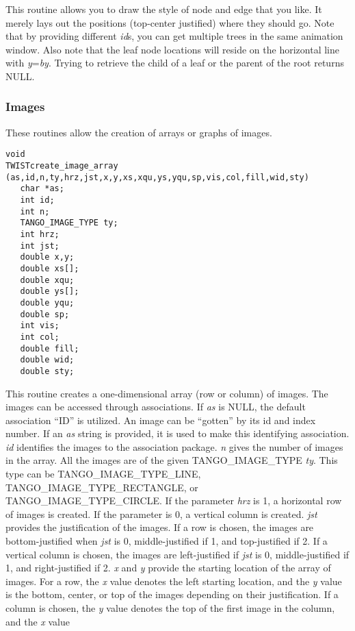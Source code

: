 This routine allows you to draw the style of node and edge that you like.  It
merely lays out the positions (top-center justified) where they should go.
Note that by providing different {\em id}s, you can get multiple trees in the
same animation window.  Also note that the leaf node locations will reside on
the horizontal line with {\em y}={\em by}.  Trying to retrieve the child of a
leaf or the parent of the root returns NULL.

\subsubsection{Images}
These routines allow the creation of arrays or graphs of images.
\vspace{1em}
\begin{verbatim}
void
TWISTcreate_image_array (as,id,n,ty,hrz,jst,x,y,xs,xqu,ys,yqu,sp,vis,col,fill,wid,sty) 
   char *as;
   int id;
   int n;
   TANGO_IMAGE_TYPE ty;
   int hrz;
   int jst;
   double x,y;
   double xs[];
   double xqu;
   double ys[];
   double yqu;
   double sp;
   int vis;
   int col;
   double fill;
   double wid;
   double sty;
\end{verbatim}
This routine creates a one-dimensional array (row or column) of
images.  The images can be accessed through associations.  If {\em as}
is NULL, the default association ``ID'' is utilized.  An image can be
``gotten'' by its id and index number.  If an {\em as} string is
provided, it is used to make this identifying association.  {\em id}
identifies the images to the association package.  {\em n} gives the
number of images in the array.  All the images are of the given
TANGO\_IMAGE\_TYPE {\em ty}.  This type can be
TANGO\_IMAGE\_TYPE\_LINE, TANGO\_IMAGE\_TYPE\_RECTANGLE, or
TANGO\_IMAGE\_TYPE\_CIRCLE.  If the parameter {\em hrz} is 1, a
horizontal row of images is created.  If the parameter is 0, a
vertical column is created. {\em jst} provides the justification of
the images.  If a row is chosen, the images are bottom-justified when
{\em jst} is 0, middle-justified if 1, and top-justified if 2.  If a
vertical column is chosen, the images are left-justified if {\em jst}
is 0, middle-justified if 1, and right-justified if 2.  {\em x} and
{\em y} provide the starting location of the array of images.  For a
row, the {\em x} value denotes the left starting location, and the
{\em y} value is the bottom, center, or top of the images depending on
their justification.  If a column is chosen, the {\em y} value denotes
the top of the first image in the column, and the {\em x} value
